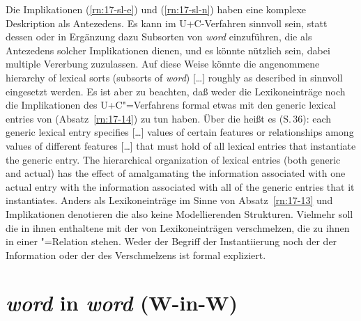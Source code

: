 \documentclass[output=paper]{LSP/langsci}
\begin{document}
\randnum\label{rn:17-81a}Die Implikationen (\ref{rn:17-sl-e}) und (\ref{rn:17-sl-n}) haben eine komplexe Deskription als Antezedens. Es kann im U+C-Verfahren sinnvoll sein, statt dessen oder in Ergänzung dazu Subsorten von \textit{word} einzuführen, die als Antezedens solcher Implikationen dienen, und es könnte nützlich sein, dabei multiple Vererbung zuzulassen. Auf diese Weise könnte die angenommene {\glqq}hierarchy of lexical sorts (subsorts of \textit{word}) [\ldots{}] roughly as described in \citet[Chapter~8]{PollardSag1987}{\grqq} \citep[395]{PollardSag1994} sinnvoll eingesetzt werden. Es ist aber zu beachten, daß weder die Lexikoneinträge noch die Implikationen des U+C"=Verfahrens formal etwas mit den {\glq}generic lexical entries{\grq} von \citet[36f.]{PollardSag1994} (Absatz~\ref{rn:17-14}) zu tun haben. Über die heißt es (S.\,36): {\glqq}each generic lexical entry specifies [\ldots{}] values of certain features or relationships among values of different features [\ldots{}] that must hold of all lexical entries that instantiate the generic entry. The hierarchical organization of lexical entries (both generic and actual) has the effect of amalgamating the information associated with one actual entry with the information associated with all of the generic entries that it instantiates{\grqq}. Anders als Lexikoneinträge im Sinne von Absatz~\ref{rn:17-13} und Implikationen denotieren die  also keine Modellierenden Strukturen. Vielmehr soll die in ihnen enthaltene  mit der von Lexikoneinträgen {\glqq}verschmelzen{\grqq}, die zu ihnen in einer "=Relation stehen. Weder der Begriff der Instantiierung noch der der Information oder der des Verschmelzens ist formal expliziert.
\pagebreak

\section{\textit{word} in \textit{word} (W-in-W)}
\end{document}

